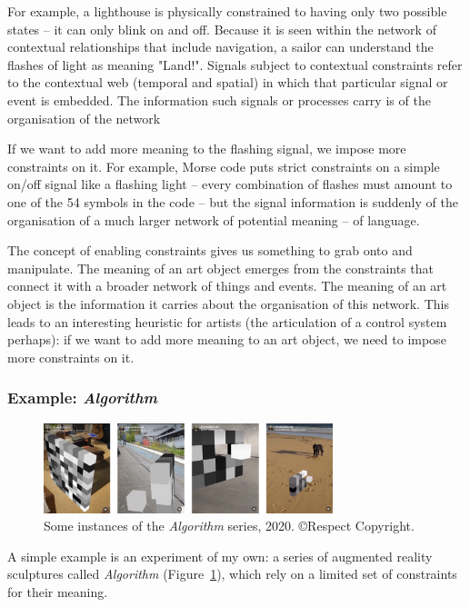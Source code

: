 \documentclass[letter:wpaper]{article}
\begin{document}
    For example, a lighthouse is physically constrained to having only two possible states – it can only blink on and off. Because it is seen within the network of contextual relationships that include navigation, a sailor can understand the flashes of light as meaning "Land!". Signals subject to contextual constraints refer to the contextual web (temporal and spatial) in which that particular signal or event is embedded. The information such signals or processes carry is of the organisation of the network \citep[p.237]{JuarreroCsltyAsCnstrnt1998}
    
    If we want to add more meaning to the flashing signal, we impose more constraints on it. For example, Morse code puts strict constraints on a simple on/off signal like a flashing light – every combination of flashes must amount to one of the 54 symbols in the code – but the signal information is suddenly of the organisation of a much larger network of potential meaning – of language.

    The concept of enabling constraints gives us something to grab onto and manipulate. The meaning of an art object emerges from the constraints that connect it with a broader network of things and events. The meaning of an art object is the information it carries about the organisation of this network. This leads to an interesting heuristic for artists (the articulation of a control system perhaps): if we want to add more meaning to an art object, we need to impose more constraints on it.

    \subsubsection{Example: \emph{Algorithm}}

    \begin{figure}[h]
        \includegraphics[width=3.31in]{bubble-sort.png}
        \caption{Some instances of the \emph{Algorithm} series, 2020. \copyright Respect Copyright.}
        \label{fig:bubble-sort}
    \end{figure}

    A simple example is an experiment of my own: a series of augmented reality sculptures called \emph{Algorithm} (Figure~\ref{fig:bubble-sort}), which rely on a limited set of constraints for their meaning.
    
\end{document}
